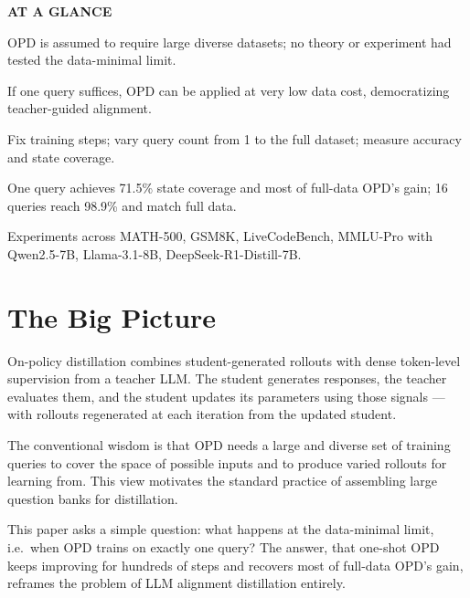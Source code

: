 \documentclass[10pt,twocolumn]{article}
\begin{document}
\begin{mdframed}[backgroundcolor=boxgray,linecolor=rulered,linewidth=1pt,
    innerleftmargin=6pt,innerrightmargin=6pt,
    innertopmargin=6pt,innerbottommargin=6pt]
\textbf{\small AT A GLANCE}\par\vspace{4pt}
\begin{description}[leftmargin=0pt,labelsep=4pt,itemsep=2pt,parsep=0pt,
    font=\small\bfseries]
  \item[Problem:] OPD is assumed to require large diverse datasets;
    no theory or experiment had tested the data-minimal limit.
  \item[Why it matters:] If one query suffices, OPD can be applied
    at very low data cost, democratizing teacher-guided alignment.
  \item[Method:] Fix training steps; vary query count from 1 to
    the full dataset; measure accuracy and state coverage.
  \item[Result:] One query achieves 71.5\% state coverage and most of
    full-data OPD's gain; 16 queries reach 98.9\% and match full data.
  \item[Evidence:] Experiments across MATH-500, GSM8K, LiveCodeBench,
    MMLU-Pro with Qwen2.5-7B, Llama-3.1-8B, DeepSeek-R1-Distill-7B.
\end{description}
\end{mdframed}

\section{The Big Picture}

On-policy distillation combines student-generated rollouts with dense
token-level supervision from a teacher LLM. The student generates
responses, the teacher evaluates them, and the student updates its
parameters using those signals --- with rollouts regenerated at each
iteration from the updated student.

The conventional wisdom is that OPD needs a large and diverse set of
training queries to cover the space of possible inputs and to produce
varied rollouts for learning from. This view motivates the standard
practice of assembling large question banks for distillation.

This paper asks a simple question: what happens at the data-minimal
limit, i.e.\ when OPD trains on exactly one query? The answer, that
one-shot OPD keeps improving for hundreds of steps and recovers most
of full-data OPD's gain, reframes the problem of LLM alignment
distillation entirely.
\end{document}
